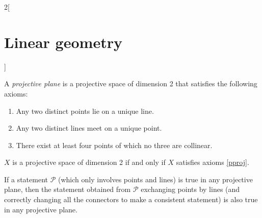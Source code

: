 \documentclass[../../../main.tex]{subfiles}
\begin{document}
\begin{multicols}{2}[\section{Linear geometry}]
\begin{definition}
\label{pproj}
A \textit{projective plane} is a projective space of dimension 2 that satisfies the following axioms:
\begin{enumerate}
    \item Any two distinct points lie on a unique line.
    \item Any two distinct lines meet on a unique point.
    \item There exist at least four points of which no three are collinear.
\end{enumerate}
\end{definition}
\begin{theorem}
$X$ is a projective space of dimension 2 if and only if $X$ satisfies axioms \ref{pproj}.
\end{theorem}
\begin{theorem}
If a statement $\mathcal{P}$ (which only involves points and lines) is true in any projective plane, then the statement obtained from $\mathcal{P}$ exchanging points by lines (and correctly changing all the connectors to make a consistent statement) is also true in any projective plane.
\end{theorem}

\end{multicols}
\end{document}
